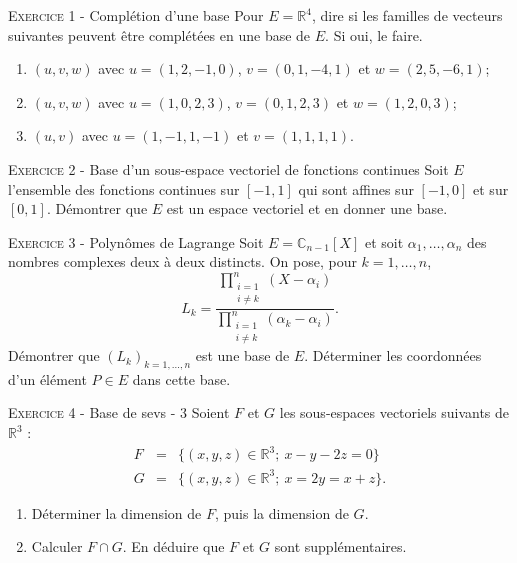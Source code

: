 \documentclass[11pt]{article}
\begin{document}
 

\begin{center}\textsc{{\huge }}\end{center}



\vskip0.3cm\noindent\textsc{Exercice 1} - Complétion d'une base
\vskip0.2cm
Pour $E=\mathbb R^4$, dire si les familles de vecteurs suivantes
peuvent être complétées en une base de $E$. Si oui, le faire.
\begin{enumerate}
\item $(u,v,w)$ avec $u=(1,2,-1,0)$, $v=(0,1,-4,1)$ et $w=(2,5,-6,1)$;
\item $(u,v,w)$ avec $u=(1,0,2,3)$, $v=(0,1,2,3)$ et $w=(1,2,0,3)$;
\item $(u,v)$ avec $u=(1,-1,1,-1)$ et $v=(1,1,1,1)$.
\end{enumerate}




\vskip0.3cm\noindent\textsc{Exercice 2} - Base d'un sous-espace vectoriel de fonctions continues
\vskip0.2cm
Soit $E$ l'ensemble des fonctions continues sur $[-1,1]$ qui sont affines sur $[-1,0]$ et sur $[0,1]$.
Démontrer que $E$ est un espace vectoriel et en donner une base.




\vskip0.3cm\noindent\textsc{Exercice 3} - Polynômes de Lagrange
\vskip0.2cm
Soit $E=\mathbb C_{n-1}[X]$ et soit $\alpha_1,\dots,\alpha_n$ des nombres complexes deux à deux distincts. On pose, pour $k=1,\dots,n$,
$$L_k=\frac{\prod_{\substack{i=1\\i\neq k}}^n (X-\alpha_i)}{\prod_{\substack{i=1\\i\neq k}}^n (\alpha_k-\alpha_i)}.$$
Démontrer que $(L_k)_{k=1,\dots,n}$ est une base de $E$. Déterminer les coordonnées d'un élément $P\in E$ dans cette base.




\vskip0.3cm\noindent\textsc{Exercice 4} - Base de sevs - 3
\vskip0.2cm
Soient $F$ et $G$ les sous-espaces vectoriels suivants de $\mathbb R^3$ :
\begin{eqnarray*}
F&=&\{(x,y,z)\in\mathbb R^3;\ x-y-2z=0\}\\
G&=&\{(x,y,z)\in\mathbb R^3;\ x=2y=x+z\}.
\end{eqnarray*}
\begin{enumerate}
\item Déterminer la dimension de $F$, puis la dimension de $G$.
\item Calculer $F\cap G$. En déduire que $F$ et $G$ sont supplémentaires.
\end{enumerate}
\end{document}
